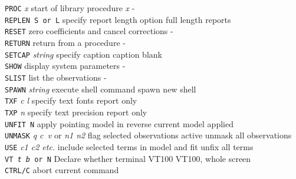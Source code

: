 {\begin{small}
\begin{tabs}
{\tt PROC} {\it x} \> start of library procedure {\it x} \> - \\
{\tt REPLEN S {\rm or} L} \> specify report length option \>
                      full length reports \\
{\tt RESET} \> zero coefficients and cancel corrections \> - \\
{\tt RETURN} \> return from a procedure \> - \\
{\tt SETCAP} {\it string} \> specify caption \> caption blank \\
{\tt SHOW} \> display system parameters \> - \\
{\tt SLIST} \> list the observations \> - \\
{\tt SPAWN} {\it string} \> execute shell command \> spawn new shell \\
{\tt TXF} {\it c l} \> specify text fonts \> report only \\
{\tt TXP} {\it n} \> specify text precision \> report only \\
{\tt UNFIT N} \> apply pointing model in reverse \>
                        current model applied \\
{\tt UNMASK} {\it q c\, v} or {\it n1 n2} \>
                        flag selected observations active \>
                        unmask all observations \\
{\tt USE} {\it c1 c2 etc.} \> include selected terms
                        in model and fit \> unfix all terms \\
{\tt VT {\it t b} {\rm or} N} \> Declare whether terminal VT100 \>
                        VT100, whole screen \\
{\tt CTRL/C} \> abort current command \>
\end{tabs}
\end{small}
}

